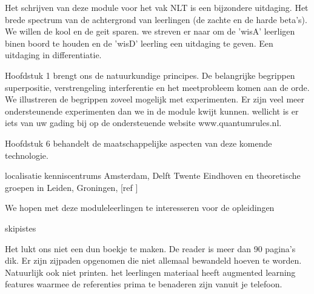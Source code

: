 \documentclass[../../main.tex]{subfiles}
\begin{document}
Het schrijven van deze module voor het vak NLT is een bijzondere uitdaging. Het brede spectrum van de achtergrond van leerlingen (de zachte en de harde beta's). 
We willen de kool en de geit sparen. we streven er naar om de 'wisA' leerligen binen boord te houden en de 'wisD' leerling een uitdaging te geven. Een uitdaging in differentiatie. 


Hoofdstuk 1 brengt ons de natuurkundige principes.
De belangrijke begrippen superpositie, verstrengeling interferentie en het meetprobleem komen aan de orde. We illustreren de begrippen zoveel mogelijk met experimenten. Er zijn veel meer ondersteunende experimenten dan we in de module kwijt kunnen. wellicht is er iets van uw gading bij op de ondersteuende website www.quantumrules.nl. 

Hoofdstuk 6 behandelt de maatschappelijke aspecten van deze komende technologie.

localisatie kenniscentrums Amsterdam, Delft Twente Eindhoven en theoretische groepen in Leiden, Groningen, [ref ]

We hopen met deze moduleleerlingen te interesseren voor de opleidingen 


skipistes

Het lukt ons niet een dun boekje te maken. De reader is meer dan 90 pagina's dik. Er zijn zijpaden opgenomen die niet allemaal bewandeld hoeven te worden. Natuurlijk ook niet printen. het leerlingen materiaal heeft augmented learning features waarmee de referenties prima te benaderen zijn vanuit je telefoon.
\fi%
\iffalse%
\end{document}
